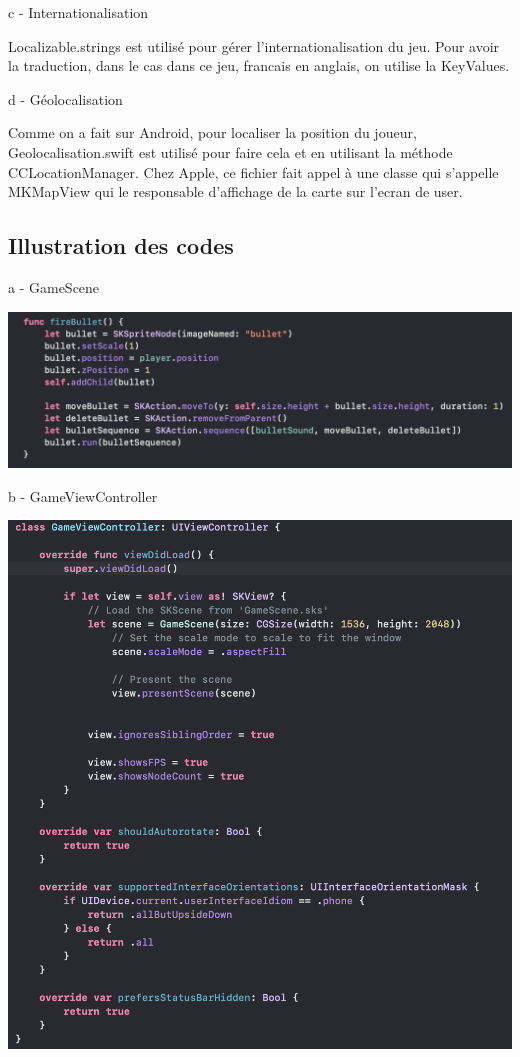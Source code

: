 \documentclass{rapportECL}
\begin{document}
c - Internationalisation

Localizable.strings est utilisé pour gérer l'internationalisation du jeu. Pour avoir la traduction, dans le cas dans ce jeu, francais en anglais, on utilise la KeyValues.\newline


d - Géolocalisation

Comme on a fait sur Android, pour localiser la position du joueur, Geolocalisation.swift est utilisé pour faire cela et en utilisant la méthode CCLocationManager\cite{GooglemapsiOS}. Chez Apple\cite{iOS}, ce fichier fait appel à une classe qui s'appelle MKMapView qui le responsable d'affichage de la carte sur l'ecran de user.



\subsection{Illustration des codes}
 a - GameScene
 
 \begin{center}
    \includegraphics[scale = 0.5]{logos/FireBullet.png}
\end{center}

 b - GameViewController
 
 \begin{center}
    \includegraphics[scale = 0.5]{logos/GameViewController.png}
\end{center}
\end{document}
